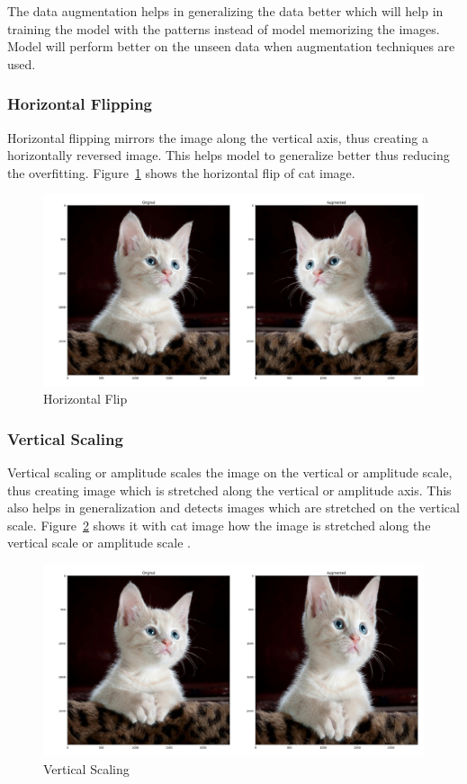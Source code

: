The data augmentation helps in generalizing the data better which will help in training the model with the patterns instead of model memorizing the images. Model will perform better on the unseen data when augmentation techniques are used. 

\subsubsection{Horizontal Flipping}
Horizontal flipping mirrors the image along the vertical axis, thus creating a horizontally reversed image. This helps model to generalize better thus reducing the overfitting. Figure~\ref{hflip} shows the horizontal flip of cat image.

\begin{figure}[h]
    \centering
    \includegraphics[width=0.6\linewidth]{Bilder/jpg/Horizontal flip.png}
    \caption{Horizontal Flip~\cite{kitten}}
    \label{hflip}
\end{figure}

\subsubsection{Vertical Scaling}
Vertical scaling or amplitude scales the image on the vertical or amplitude scale, thus creating image which is stretched along the vertical or amplitude axis. This also helps in generalization and detects images which are stretched on the vertical scale. Figure~\ref{amp} shows it with cat image how the image is stretched along the vertical scale or amplitude scale .

\begin{figure}[h]
    \centering
    \includegraphics[width=0.6\linewidth]{Bilder/jpg/amp.png}
    \caption{Vertical Scaling~\cite{kitten}}
    \label{amp}
\end{figure}

